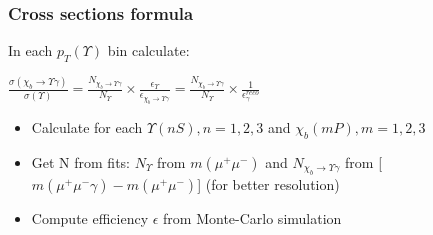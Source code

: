 \begin{frame}
\frametitle{Cross sections formula}
In each $p_T(\Upsilon)$ bin calculate:
\begin{center}
$\frac{\sigma(\chi_{b} \rightarrow \Upsilon \gamma)}{\sigma(\Upsilon)} = \frac{N_{\chi_b \rightarrow \Upsilon \gamma}}{N_{\Upsilon}} \times \frac{\epsilon_{\Upsilon}}{\epsilon_{\chi_b \rightarrow \Upsilon \gamma}} = \frac{N_{\chi_b \rightarrow \Upsilon \gamma}}{N_{\Upsilon}} \times \frac{1}{\epsilon_{\gamma}^{reco}}$
\end{center}
\begin{itemize}
  \item Calculate for each $\Upsilon(nS), n=1,2,3$ and $\chi_b(mP), m=1,2,3$
  \item Get N from fits: $N_{\Upsilon}$ from  $m(\mu^+ \mu^-)$ and $N_{\chi_b \rightarrow \Upsilon \gamma}$ from [$m(\mu^+ \mu^- \gamma) - m(\mu^+ \mu^-)$] (for better resolution)
  \item Compute efficiency $\epsilon$  from Monte-Carlo simulation
\end{itemize}
\end{frame}